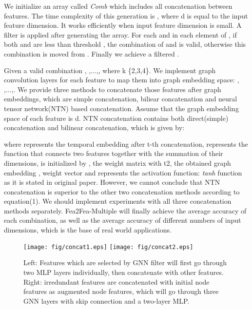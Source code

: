 \documentclass[runningheads]{llncs}
\newcommand{\xhdr}[1]{\vspace{1.7mm}\noindent{{\bf #1}}}
\begin{document}
 We initialize an array called \textit{Comb} which includes all concatenation between features. The time complexity of this generation is , where d is equal to the input feature dimension. It works efficiently when input feature dimension is small. A filter is applied after generating the array. For each  and  in each element of , if both  and  are less than threshold , the combination of  and  is valid, otherwise this combination is moved from . Finally we achieve a filtered .

\xhdr{Feature concatenation}  
Given a valid combination , ,...,, where k \{2,3,4\}. We implement graph convolution layers for each feature to map them into graph embedding space: , ,...,. We provide three methods to concatenate those features after graph embeddings, which are simple concatenation, biliear concatenation and neural tensor network(NTN) \cite{NIPS2013_b337e84d} based concatenation. Assume that the graph embedding space of each feature is d. NTN concatenation contains both direct(simple) concatenation and bilinear concatenation, which is given by:

where  represents the temporal embedding after t-th concatenation,  represents the function that connects two features together with the summation of their dimensions,  is initialized by , the weight matrix  with t2, the obtained graph embedding ,
weight vector  and  represents the activation function: \textit{tanh} function as it is stated in original paper. However, we cannot conclude that NTN concatenation is superior to the other two concatenation methods according to equation(1). We should implement experiments with all three concatenation methods separately. Fea2Fea-Multiple will finally achieve the average accuracy of each combination, as well as the average accuracy of different numbers of input dimensions, which is the base of real world applications.
\begin{figure}[!tp]
  \centering
  \begin{center}
    \hspace*{-1in}
      \texttt{[image: fig/concat1.eps]}
      \texttt{[image: fig/concat2.eps]}
      \hspace*{-1in}
      \caption{Left: Features which are selected by GNN filter will first go through two MLP layers individually, then concatenate with other features. Right: irredundant features are concatenated with initial node features as augmented node features, which will go through three GNN layers with skip connection and a two-layer MLP. }
    \end{center}
  \end{figure}
\vspace{-0.5cm}
\end{document}
